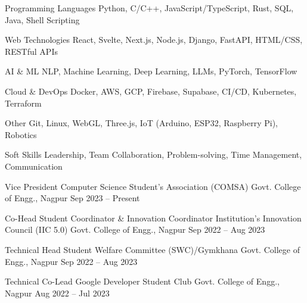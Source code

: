 \documentclass[11pt, a4paper]{awesome-cv}
\begin{document}

\begin{cvskills}

\cvskill
  {Programming Languages}
  {Python, C/C++, JavaScript/TypeScript, Rust, SQL, Java, Shell Scripting}

\cvskill
  {Web Technologies}
  {React, Svelte, Next.js, Node.js, Django, FastAPI, HTML/CSS, RESTful APIs}

\cvskill
  {AI \& ML}
  {NLP, Machine Learning, Deep Learning, LLMs, PyTorch, TensorFlow}

\cvskill
  {Cloud \& DevOps}
  {Docker, AWS, GCP, Firebase, Supabase, CI/CD, Kubernetes, Terraform}

\cvskill
  {Other}
  {Git, Linux, WebGL, Three.js, IoT (Arduino, ESP32, Raspberry Pi), Robotics}

\cvskill
 {Soft Skills}
 {Leadership, Team Collaboration, Problem-solving, Time Management, Communication}

\end{cvskills}


\begin{cventries}

\cventry
  {Vice President}
  {Computer Science Student's Association (COMSA)}
  {Govt. College of Engg., Nagpur}
  {Sep 2023 -- Present}
  {}

\cventry
  {Co-Head Student Coordinator \& Innovation Coordinator}
  {Institution's Innovation Council (IIC 5.0)}
  {Govt. College of Engg., Nagpur}
  {Sep 2022 -- Aug 2023}
  {}

\cventry
  {Technical Head}
  {Student Welfare Committee (SWC)/Gymkhana}
  {Govt. College of Engg., Nagpur}
  {Sep 2022 -- Aug 2023}
  {}

\cventry
  {Technical Co-Lead}
  {Google Developer Student Club}
  {Govt. College of Engg., Nagpur}
  {Aug 2022 -- Jul 2023}
  {}

\end{cventries}

\end{document}
